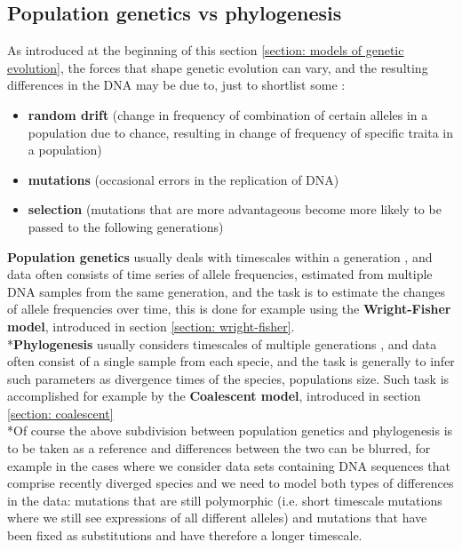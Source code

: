 \documentclass[12pt,mythesisstyle]{report}
\begin{document}
\subsection{Population genetics vs phylogenesis}\label{section: genetics vs phylogenesis}
As introduced at the beginning of this section \ref{section: models of genetic evolution}, the forces that shape genetic evolution can vary, and the resulting differences in the DNA may be due to, just to shortlist some  \cite{wrightexplained}:
\begin{itemize}
	\item \textbf{random drift} (change in frequency of combination of certain alleles in a population due to chance, resulting in change of frequency of specific traita in a population)
	\item \textbf{mutations} (occasional errors in the replication of DNA)
	\item \textbf{selection} (mutations that are more advantageous become more likely to be passed to the following generations)
\end{itemize}
\textbf{Population genetics} usually deals with timescales within a generation \cite{wrightexplained}, and data often consists of time series of allele frequencies, estimated from multiple DNA samples from the same generation, and the task is to estimate the changes of allele frequencies over time, this is done for example using the \textbf{Wright-Fisher model}, introduced in section \ref{section: wright-fisher}.
\\*\textbf{Phylogenesis} usually considers timescales of multiple generations \cite{wrightexplained}, and data often consist of a single sample from each specie, and the task is generally to infer such parameters as divergence times of the species, populations size. Such task is accomplished for example by the \textbf{Coalescent model}, introduced in section \ref{section: coalescent}
\\*Of course the above subdivision between population genetics and phylogenesis is to be taken as a reference and differences between the two can be blurred, for example in the cases where we consider data sets containing DNA sequences that comprise recently diverged species and we need to model both types of differences in the data: mutations that are still polymorphic (i.e. short timescale mutations where we still see expressions of all different alleles) and mutations that have been fixed as substitutions and have therefore a longer timescale\cite{wrightexplained}.
\end{document}

